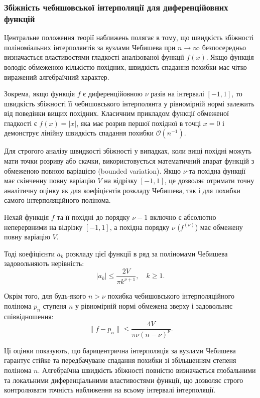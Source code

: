 \subsubsection{Збіжність чебишовської інтерполяції для диференційовних функцій}

Центральне положення теорії наближень полягає в тому, що швидкість збіжності поліноміальних інтерполянтів за вузлами Чебишева при $n \to \infty$ безпосередньо визначається властивостями гладкості аналізованої функції $f(x)$. Якщо функція володіє обмеженою кількістю похідних, швидкість спадання похибки має чітко виражений алгебраїчний характер.

Зокрема, якщо функція $f$ є диференційовною $\nu$ разів на інтервалі $[-1, 1]$, то швидкість збіжності її чебишовського інтерполянта у рівномірній нормі залежить від поведінки вищих похідних. Класичним прикладом функції обмеженої гладкості є $f(x) = |x|$, яка має розрив першої похідної в точці $x=0$ і демонструє лінійну швидкість спадання похибки $\mathcal{O}(n^{-1})$.

Для строгого аналізу швидкості збіжності у випадках, коли вищі похідні можуть мати точки розриву або скачки, використовується математичний апарат функцій з обмеженою повною варіацією (bounded variation). Якщо $\nu$-та похідна функції має скінченну повну варіацію $V$ на відрізку $[-1, 1]$, це дозволяє отримати точну аналітичну оцінку як для коефіцієнтів розкладу Чебишева, так і для похибки самого інтерполяційного полінома.

\begin{statement}
	\label{st:convergence_differentiable}
	Нехай функція $f$ та її похідні до порядку $\nu-1$ включно є абсолютно неперервними на відрізку $[-1, 1]$, а похідна порядку $\nu$ ($f^{(\nu)}$) має обмежену повну варіацію $V$. 
	
	Тоді коефіцієнти $a_k$ розкладу цієї функції в ряд за поліномами Чебишева задовольняють нерівність:
	\begin{equation}\label{eq:cheb_coeff_bound}
		|a_k| \le \frac{2V}{\pi k^{\nu+1}}, \quad k \ge 1.
	\end{equation}
	
	Окрім того, для будь-якого $n > \nu$ похибка чебишовського інтерполяційного полінома $p_n$ ступеня $n$ у рівномірній нормі обмежена зверху і задовольняє співвідношення:
	\begin{equation}\label{eq:cheb_interpolant_error}
		\|f - p_n\| \le \frac{4V}{\pi \nu (n-\nu)^\nu}.
	\end{equation}
\end{statement}

Ці оцінки показують, що барицентрична інтерполяція за вузлами Чебишева гарантує стійке та передбачуване спадання похибки зі збільшенням степеня полінома $n$. Алгебраїчна швидкість збіжності повністю визначається глобальними та локальними диференціальними властивостями функції, що дозволяє строго контролювати точність наближення на всьому інтервалі інтерполяції.